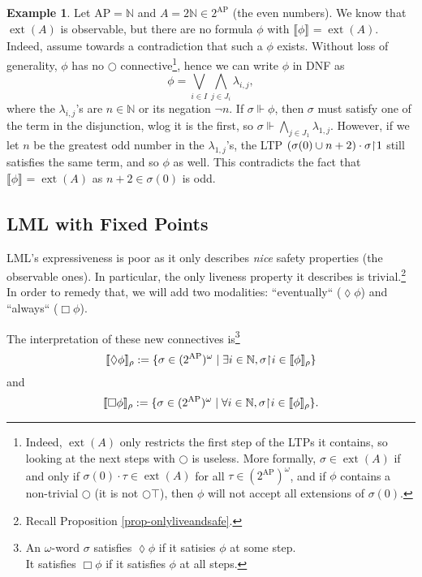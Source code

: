 \documentclass{tufte-handout} %
\theoremstyle{definition}
\newtheorem{exmp}[thm]{Example}
\theoremstyle{remark}
\newcommand{\N}{\mathbb{N}}
\newcommand{\0}{\textsf{0}}
\newcommand{\1}{\textsf{1}}
\newcommand{\AP}{\text{AP}}
\newcommand{\rest}[2]{#1 \kern-0.65ex\upharpoonright \kern-0.55ex #2}
\DeclareMathOperator{\ext}{ext}
\newcommand{\sem}[2]{\llbracket #1 \rrbracket_{#2}}
\begin{document}
\begin{exmp}
	Let $\AP= \N$ and $A = 2\N \in 2^{\AP}$ (the even numbers). We know that $\ext(A)$ is observable, but there are no formula $\phi$ with $\sem{\phi}{}= \ext(A)$. Indeed, assume towards a contradiction that such a $\phi$ exists. Without loss of generality, $\phi$ has no $\bigcirc$ connective\footnote{Indeed, $\ext(A)$ only restricts the first step of the LTPs it contains, so looking at the next steps with $\bigcirc$ is useless. More formally, $\sigma \in \ext(A)$ if and only if $\sigma(0) \cdot \tau \in \ext(A)$ for all $\tau \in (2^{\AP})^{\omega}$, and if $\phi$ contains a non-trivial $\bigcirc$ (it is not $\bigcirc \top$), then $\phi$ will not accept all extensions of $\sigma(0)$.}, hence we can write $\phi$ in DNF as \[\phi = \bigvee_{i \in I} \bigwedge_{j \in J_i} \lambda_{i,j},\]
	where the $\lambda_{i,j}$'s are $n \in \N$ or its negation $\neg n$. If $\sigma \Vdash \phi$, then $\sigma$ must satisfy one of the term in the disjunction, wlog it is the first, so $\sigma \Vdash \bigwedge_{j \in J_1} \lambda_{1,j}$. However, if we let $n$ be the greatest odd number in the $\lambda_{1,j}$'s, the LTP $(\sigma(0) \cup {n+2})\cdot \rest{\sigma}{1}$ still satisfies the same term, and so $\phi$ as well. This contradicts the fact that $\sem{\phi}{} = \ext(A)$ as $n+2 \in \sigma(0)$ is odd.
\end{exmp}

\subsection{LML with Fixed Points}
LML's expressiveness is poor as it only describes \textit{nice} safety properties (the observable ones). In particular, the only liveness property it describes is trivial.\footnote{Recall Proposition \ref{prop-onlyliveandsafe}.} In order to remedy that, we will add two modalities: ``eventually`` ($\lozenge \phi$) and ``always`` ($\Box\phi$). %

The interpretation of these new connectives is\footnote{An $\omega$-word $\sigma$ satisfies $\lozenge \phi$ if it satisies $\phi$ at some step.\\It satisfies $\Box \phi$ if it satisfies $\phi$ at all steps.} \[\sem{\lozenge \phi}{\rho}:= \{\sigma \in (2^{\AP})^{\omega} \mid \exists i \in\N, \rest{\sigma}{i} \in \sem{\phi}{\rho}\}\] and \[\sem{\Box \phi}{\rho}:= \{\sigma \in (2^{\AP})^{\omega} \mid \forall i \in\N, \rest{\sigma}{i} \in \sem{\phi}{\rho}\}.\]
\end{document}

